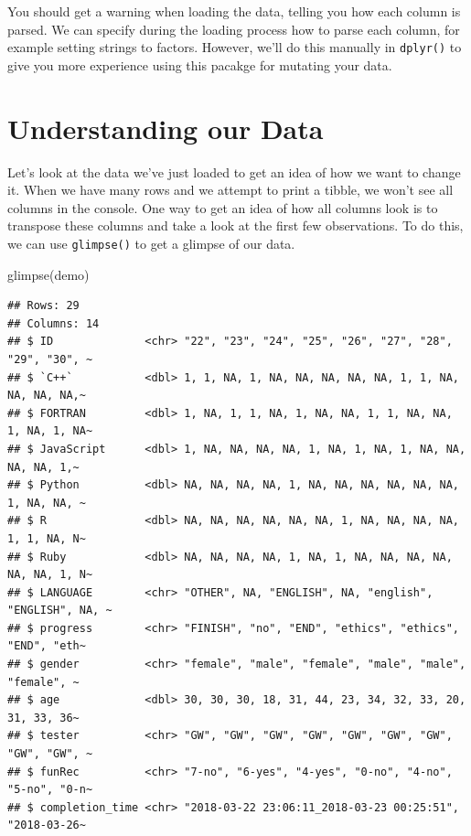 \documentclass[
]{book}
\newenvironment{Shaded}{\begin{snugshade}}{\end{snugshade}}
\newcommand{\FunctionTok}[1]{\textcolor[rgb]{0.00,0.00,0.00}{#1}}
\newcommand{\NormalTok}[1]{#1}
\begin{document}
You should get a warning when loading the data, telling you how each column is parsed. We can specify during the loading process how to parse each column, for example setting strings to factors. However, we'll do this manually in \texttt{dplyr()} to give you more experience using this pacakge for mutating your data.

\hypertarget{understanding-our-data}{%
\section{Understanding our Data}\label{understanding-our-data}}

Let's look at the data we've just loaded to get an idea of how we want to change it. When we have many rows and we attempt to print a tibble, we won't see all columns in the console. One way to get an idea of how all columns look is to transpose these columns and take a look at the first few observations. To do this, we can use \texttt{glimpse()} to get a glimpse of our data.

\begin{Shaded}
\begin{Highlighting}[]
\FunctionTok{glimpse}\NormalTok{(demo)}
\end{Highlighting}
\end{Shaded}

\begin{verbatim}
## Rows: 29
## Columns: 14
## $ ID              <chr> "22", "23", "24", "25", "26", "27", "28", "29", "30", ~
## $ `C++`           <dbl> 1, 1, NA, 1, NA, NA, NA, NA, NA, 1, 1, NA, NA, NA, NA,~
## $ FORTRAN         <dbl> 1, NA, 1, 1, NA, 1, NA, NA, 1, 1, NA, NA, 1, NA, 1, NA~
## $ JavaScript      <dbl> 1, NA, NA, NA, NA, 1, NA, 1, NA, 1, NA, NA, NA, NA, 1,~
## $ Python          <dbl> NA, NA, NA, NA, 1, NA, NA, NA, NA, NA, NA, 1, NA, NA, ~
## $ R               <dbl> NA, NA, NA, NA, NA, NA, 1, NA, NA, NA, NA, 1, 1, NA, N~
## $ Ruby            <dbl> NA, NA, NA, NA, 1, NA, 1, NA, NA, NA, NA, NA, NA, 1, N~
## $ LANGUAGE        <chr> "OTHER", NA, "ENGLISH", NA, "english", "ENGLISH", NA, ~
## $ progress        <chr> "FINISH", "no", "END", "ethics", "ethics", "END", "eth~
## $ gender          <chr> "female", "male", "female", "male", "male", "female", ~
## $ age             <dbl> 30, 30, 30, 18, 31, 44, 23, 34, 32, 33, 20, 31, 33, 36~
## $ tester          <chr> "GW", "GW", "GW", "GW", "GW", "GW", "GW", "GW", "GW", ~
## $ funRec          <chr> "7-no", "6-yes", "4-yes", "0-no", "4-no", "5-no", "0-n~
## $ completion_time <chr> "2018-03-22 23:06:11_2018-03-23 00:25:51", "2018-03-26~
\end{verbatim}
\end{document}
